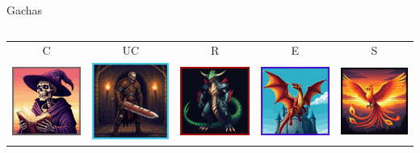 \documentclass[12pt,aspectratio=169,notheorems]{beamer}
\begin{document}
\begin{frame}{Gachas}
    \vspace{3ex}
    \begin{columns}
        \begin{column}{.85\textwidth}
            \begin{tabular}{ccccc}
                    C & UC & R & E & S \\
                     \includegraphics[width=.16\textwidth]{Skeleton mage (common).jpg} &
                     \includegraphics[width=.16\textwidth]{Undead (non-common).jpg} & 
                     \includegraphics[width=.16\textwidth]{Demon (rare).jpg} &
                     \includegraphics[width=.16\textwidth]{Dragon (epic).jpg} & 
                     \includegraphics[width=.16\textwidth]{Phoenix (legendary).jpg} \\
                     

\end{tabular}
\end{column}
\end{columns}
\end{frame}
\end{document}
